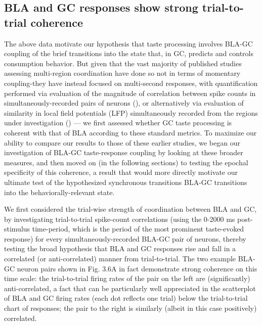 \begin{refsection}
\subsection{BLA and GC responses show strong trial-to-trial coherence}
The above data motivate our hypothesis that taste processing involves BLA-GC coupling of the brief transitions into the state that, in GC, predicts and controls consumption behavior. But given that the vast majority of published studies assessing multi-region coordination have done so not in terms of momentary coupling-they have instead focused on multi-second responses, with quantification performed via evaluation of the magnitude of correlation between spike counts in simultaneously-recorded pairs of neurons (\cite{averbeck2006a,averbeck2006b}), or alternatively via evaluation of similarity in local field potentials (LFP) simultaneously recorded from the regions under investigation (\cite{place2016a}) --- we first assessed whether GC taste processing is coherent with that of BLA according to these standard metrics. To maximize our ability to compare our results to those of these earlier studies, we began our investigation of BLA-GC taste-response coupling by looking at these broader measures, and then moved on (in the following sections) to testing the epochal specificity of this coherence, a result that would more directly motivate our ultimate test of the hypothesized synchronous transitions BLA-GC transitions into the behaviorally-relevant state.

We first considered the trial-wise strength of coordination between BLA and GC, by investigating trial-to-trial spike-count correlations (using the 0-2000 ms post-stimulus time-period, which is the period of the most prominent taste-evoked response) for every simultaneously-recorded BLA-GC pair of neurons, thereby testing the broad hypothesis that BLA and GC responses rise and fall in a correlated (or anti-correlated) manner from trial-to-trial. The two example BLA-GC neuron pairs shown in Fig. 3.6A in fact demonstrate strong coherence on this time scale: the trial-to-trial firing rates of the pair on the left are (significantly) anti-correlated, a fact that can be particularly well appreciated in the scatterplot of BLA and GC firing rates (each dot reflects one trial) below the trial-to-trial chart of responses; the pair to the right is similarly (albeit in this case positively) correlated. 


\end{refsection}
